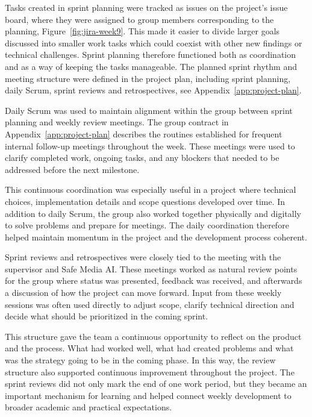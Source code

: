 Tasks created in sprint planning were tracked as issues on the project’s issue board, where they were assigned to group members corresponding to the planning, Figure~\ref{fig:jira-week9}. This made it easier to divide larger goals discussed into smaller work tasks which could coexist with other new findings or technical challenges. Sprint planning therefore functioned both as coordination and as a way of keeping the tasks manageable. The planned sprint rhythm and meeting structure were defined in the project plan, including sprint planning, daily Scrum, sprint reviews and retrospectives, see Appendix~\ref{app:project-plan}.


Daily Scrum was used to maintain alignment within the group between sprint planning and weekly review meetings. The group contract in Appendix~\ref{app:project-plan} describes the routines established for frequent internal follow-up meetings throughout the week. These meetings were used to clarify completed work, ongoing tasks, and any blockers that needed to be addressed before the next milestone.

This continuous coordination was especially useful in a project where technical choices, implementation details and scope questions developed over time. In addition to daily Scrum, the group also worked together physically and digitally to solve problems and prepare for meetings. The daily coordination therefore helped maintain momentum in the project and the development process coherent.


Sprint reviews and retrospectives were closely tied to the meeting with the supervisor and Safe Media AI. These meetings worked as natural review points for the group where status was presented, feedback was received, and afterwards a discussion of how the project can move forward. Input from these weekly sessions was often used directly to adjust scope, clarify technical direction and decide what should be prioritized in the coming sprint.

This structure gave the team a continuous opportunity to reflect on the product and the process. What had worked well, what had created problems and what was the strategy going to be in the coming phase. In this way, the review structure also supported continuous improvement throughout the project. The sprint reviews did not only mark the end of one work period, but they became an important mechanism for learning and helped connect weekly development to broader academic and practical expectations.

